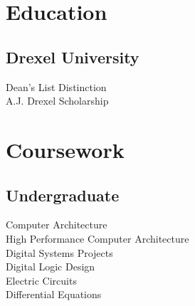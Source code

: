 \documentclass[]{deedy-resume-openfont}
\begin{document}
%
%
\lastupdated

%
%



%
%

\begin{minipage}[t]{0.33\textwidth} 


\section{Education} 

\subsection{Drexel University}
Dean's List Distinction \\
A.J. Drexel Scholarship \\
\sectionsep



\section{Coursework}
\subsection{Undergraduate}
Computer Architecture \\ 
High Performance Computer Architecture\\
Digital Systems Projects \\
Digital Logic Design \\
Electric Circuits \\
Differential Equations \\
\sectionsep



\end{minipage}
\end{document}
